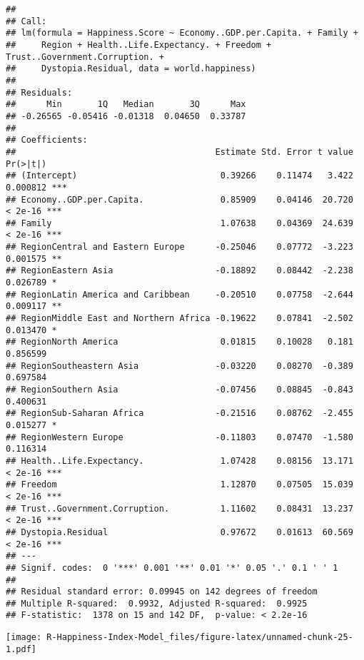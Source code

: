 \documentclass[
]{article}
\newenvironment{Shaded}{\begin{snugshade}}{\end{snugshade}}
\newcommand{\FloatTok}[1]{\textcolor[rgb]{0.00,0.00,0.81}{#1}}
\newcommand{\FunctionTok}[1]{\textcolor[rgb]{0.00,0.00,0.00}{#1}}
\newcommand{\NormalTok}[1]{#1}
\newcommand{\SpecialCharTok}[1]{\textcolor[rgb]{0.00,0.00,0.00}{#1}}
\begin{document}
\begin{verbatim}
## 
## Call:
## lm(formula = Happiness.Score ~ Economy..GDP.per.Capita. + Family + 
##     Region + Health..Life.Expectancy. + Freedom + Trust..Government.Corruption. + 
##     Dystopia.Residual, data = world.happiness)
## 
## Residuals:
##      Min       1Q   Median       3Q      Max 
## -0.26565 -0.05416 -0.01318  0.04650  0.33787 
## 
## Coefficients:
##                                       Estimate Std. Error t value Pr(>|t|)    
## (Intercept)                            0.39266    0.11474   3.422 0.000812 ***
## Economy..GDP.per.Capita.               0.85909    0.04146  20.720  < 2e-16 ***
## Family                                 1.07638    0.04369  24.639  < 2e-16 ***
## RegionCentral and Eastern Europe      -0.25046    0.07772  -3.223 0.001575 ** 
## RegionEastern Asia                    -0.18892    0.08442  -2.238 0.026789 *  
## RegionLatin America and Caribbean     -0.20510    0.07758  -2.644 0.009117 ** 
## RegionMiddle East and Northern Africa -0.19622    0.07841  -2.502 0.013470 *  
## RegionNorth America                    0.01815    0.10028   0.181 0.856599    
## RegionSoutheastern Asia               -0.03220    0.08270  -0.389 0.697584    
## RegionSouthern Asia                   -0.07456    0.08845  -0.843 0.400631    
## RegionSub-Saharan Africa              -0.21516    0.08762  -2.455 0.015277 *  
## RegionWestern Europe                  -0.11803    0.07470  -1.580 0.116314    
## Health..Life.Expectancy.               1.07428    0.08156  13.171  < 2e-16 ***
## Freedom                                1.12870    0.07505  15.039  < 2e-16 ***
## Trust..Government.Corruption.          1.11602    0.08431  13.237  < 2e-16 ***
## Dystopia.Residual                      0.97672    0.01613  60.569  < 2e-16 ***
## ---
## Signif. codes:  0 '***' 0.001 '**' 0.01 '*' 0.05 '.' 0.1 ' ' 1
## 
## Residual standard error: 0.09945 on 142 degrees of freedom
## Multiple R-squared:  0.9932, Adjusted R-squared:  0.9925 
## F-statistic:  1378 on 15 and 142 DF,  p-value: < 2.2e-16
\end{verbatim}

\begin{Shaded}
\end{Shaded}

\texttt{[image: R-Happiness-Index-Model\_files/figure-latex/unnamed-chunk-25-1.pdf]}
\end{document}
